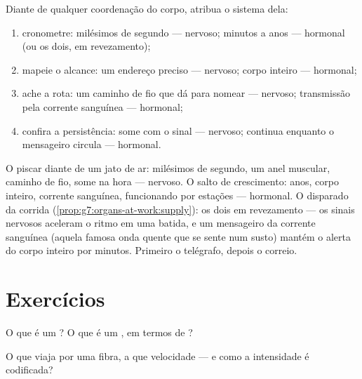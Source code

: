 \begin{method}\label{met:g8:nervous-communication:diagnose}
Diante de qualquer coordenação do corpo, atribua o sistema dela:
\begin{enumerate}
  \item cronometre: milésimos de segundo --- nervoso; minutos a anos
        --- hormonal (ou os dois, em revezamento);
  \item mapeie o alcance: um endereço preciso --- nervoso; corpo
        inteiro --- hormonal;
  \item ache a rota: um caminho de fio que dá para nomear ---
        nervoso; transmissão pela corrente sanguínea --- hormonal;
  \item confira a persistência: some com o sinal --- nervoso;
        continua enquanto o mensageiro circula --- hormonal.
\end{enumerate}
\end{method}

\begin{example}\label{ex:g8:nervous-communication:cases}
O piscar diante de um jato de ar: milésimos de segundo, um anel
muscular, caminho de fio, some na hora --- nervoso. O salto de
crescimento: anos, corpo inteiro, corrente sanguínea, funcionando por
estações --- hormonal. O  disparado da corrida
(\cref{prop:g7:organs-at-work:supply}): os dois em revezamento --- os
sinais nervosos aceleram o ritmo em uma batida, e um mensageiro da
corrente sanguínea (aquela famosa onda quente que se sente num susto)
mantém o alerta do corpo inteiro por minutos. Primeiro o telégrafo,
depois o correio.
\end{example}

\section{Exercícios}

\begin{exercise}[$\star$]\label{exo:g8:nervous-communication:1}
O que é um ? O que é um , em termos de ?
\end{exercise}

\begin{exercise}[$\star$]\label{exo:g8:nervous-communication:2}
O que viaja por uma fibra, a que velocidade --- e como a intensidade é
codificada?
\end{exercise}

